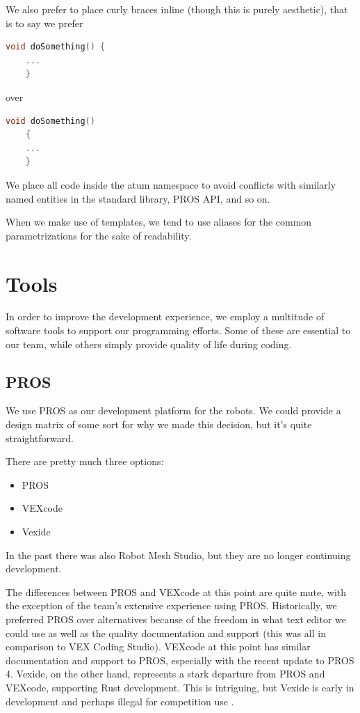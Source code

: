 We also prefer to place curly braces inline (though this is purely aesthetic), that is to say we prefer
\begin{lstlisting}[language=C++]
    void doSomething() {
    ...
    }
\end{lstlisting}
over
\begin{lstlisting}[language=C++]
    void doSomething() 
    {
    ...
    }
\end{lstlisting}

We place all code inside the atum namespace to avoid conflicts with similarly named entities in the standard library, PROS API, and so on. 

When we make use of templates, we tend to use aliases for the common parametrizations for the sake of readability.

\section{Tools}
In order to improve the development experience, we employ a multitude of software tools to support our programming efforts. Some of these are essential to our team, while others simply provide quality of life during coding.

\subsection{PROS}
We use PROS \cite{bib:pros} as our development platform for the robots. We could provide a design matrix of some sort for why we made this decision, but it's quite straightforward. 

There are pretty much three options:
\begin{itemize}
    \item PROS
    \item VEXcode
    \item Vexide
\end{itemize}

In the past there was also Robot Mesh Studio, but they are no longer continuing development. 

The differences between PROS and VEXcode at this point are quite mute, with the exception of the team's extensive experience using PROS. Historically, we preferred PROS over alternatives because of the freedom in what text editor we could use as well as the quality documentation and support (this was all in comparison to VEX Coding Studio). VEXcode at this point has similar documentation and support to PROS, especially with the recent update to PROS 4. Vexide, on the other hand, represents a stark departure from PROS and VEXcode, supporting Rust development. This is intriguing, but Vexide is early in development and perhaps illegal for competition use \cite{bib:vexidelegal}. 

